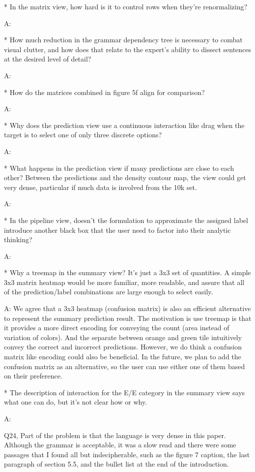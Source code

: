 * In the matrix view, how hard is it to control rows when they're renormalizing?

A:

* How much reduction in the grammar dependency tree is necessary to combat visual clutter, and how does that relate to the expert's ability to dissect sentences at the desired level of detail?

A:

* How do the matrices combined in figure 5f align for comparison?

A:

* Why does the prediction view use a continuous interaction like drag when the target is to select one of only three discrete options?

A:

* What happens in the prediction view if many predictions are close to each other? Between the predictions and the density contour map, the view could get very dense, particular if much data is involved from the 10k set.

A:

* In the pipeline view, doesn't the formulation to approximate the assigned label introduce another black box that the user need to factor into their analytic thinking?

A:

* Why a treemap in the summary view? It's just a 3x3 set of quantities. A simple 3x3 matrix heatmap would be more familiar, more readable, and assure that all of the prediction/label combinations are large enough to select easily.

A: We agree that a 3x3 heatmap (confusion matrix) is also an efficient alternative to represent the summary prediction result. The motivation is use treemap is that it provides a more direct encoding for conveying the count (area instead of variation of colors). And the separate between orange and green tile intuitively convey the correct and incorrect predictions. However, we do think a confusion matrix like encoding could also be beneficial. In the future, we plan to add the confusion matrix as an alternative, so the user can use either one of them based on their preference.

* The description of interaction for the E/E category in the summary view says what one can do, but it's not clear how or why.

A:

Q24, Part of the problem is that the language is very dense in this paper. Although the grammar is acceptable, it was a slow read and there were some passages that I found all but indecipherable, such as the figure 7 caption, the last paragraph of section 5.5, and the bullet list at the end of the introduction.

